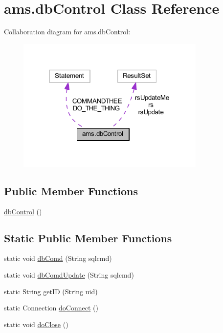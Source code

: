 \hypertarget{classams_1_1db_control}{}\section{ams.\+db\+Control Class Reference}
\label{classams_1_1db_control}


Collaboration diagram for ams.\+db\+Control\+:\nopagebreak
\begin{figure}[H]
\begin{center}
\leavevmode
\includegraphics[width=264pt]{classams_1_1db_control__coll__graph}
\end{center}
\end{figure}
\subsection*{Public Member Functions}
\begin{DoxyCompactItemize}
\item 
\mbox{\hyperlink{classams_1_1db_control_ad62d6afaf9e7f9fdd20b6d7c571a0de8}{db\+Control}} ()
\end{DoxyCompactItemize}
\subsection*{Static Public Member Functions}
\begin{DoxyCompactItemize}
\item 
static void \mbox{\hyperlink{classams_1_1db_control_ade10190f5f5a56dfddcfbba1de5de38c}{db\+Comd}} (String sqlcmd)
\item 
static void \mbox{\hyperlink{classams_1_1db_control_a725cd6ae84ef6aca9bfd782b319d9f34}{db\+Comd\+Update}} (String sqlcmd)
\item 
static String \mbox{\hyperlink{classams_1_1db_control_ac130c7d3b8e1b37cfcacc3f05b9562d2}{get\+ID}} (String uid)
\item 
static Connection \mbox{\hyperlink{classams_1_1db_control_a76fc97489ad6acec2ec72d644e935362}{do\+Connect}} ()
\item 
static void \mbox{\hyperlink{classams_1_1db_control_ade1a4d8aaeedb1ae1f32a0e629aa09aa}{do\+Close}} ()
\end{DoxyCompactItemize}


